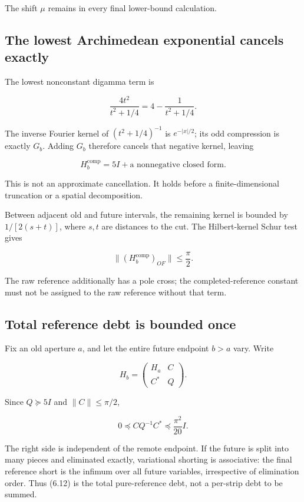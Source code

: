 \documentclass[
  10pt,
  a4paper,
  10pt,
  oneside,
  openany]{book}
\begin{document}
The shift \(\mu\) remains in every final lower-bound calculation.

\subsection{The lowest Archimedean exponential cancels
exactly}\label{the-lowest-archimedean-exponential-cancels-exactly}

The lowest nonconstant digamma term is

\[
\frac{4t^2}{t^2+1/4}=4-\frac1{t^2+1/4}.
\tag{6.8}\label{eq:6.8}
\]

The inverse Fourier kernel of \((t^2+1/4)^{-1}\) is \(e^{-|x|/2}\); its
odd compression is exactly \(G_b\). Adding \(G_b\) therefore cancels
that negative kernel, leaving

\[
H_b^{\mathrm{comp}}=5I+\text{a nonnegative closed form}.
\tag{6.9}\label{eq:6.9}
\]

This is not an approximate cancellation. It holds before a
finite-dimensional truncation or a spatial decomposition.

Between adjacent old and future intervals, the remaining kernel is
bounded by \(1/[2(s+t)]\), where \(s,t\) are distances to the cut. The
Hilbert-kernel Schur test gives

\[
\|(H_b^{\mathrm{comp}})_{OF}\|\le\frac\pi2.
\tag{6.10}\label{eq:6.10}
\]

The raw reference additionally has a pole cross; the completed-reference
constant must not be assigned to the raw reference without that term.

\subsection{Total reference debt is bounded
once}\label{total-reference-debt-is-bounded-once}

Fix an old aperture \(a\), and let the entire future endpoint \(b>a\)
vary. Write

\[
H_b=\begin{pmatrix}H_a&C\\C^*&Q\end{pmatrix}.
\tag{6.11}\label{eq:6.11}
\]

Since \(Q\succeq5I\) and \(\|C\|\le\pi/2\),

\[
0\preceq CQ^{-1}C^*\preceq\frac{\pi^2}{20}I.
\tag{6.12}\label{eq:6.12}
\]

The right side is independent of the remote endpoint. If the future is
split into many pieces and eliminated exactly, variational shorting is
associative: the final reference short is the infimum over all future
variables, irrespective of elimination order. Thus (6.12) is the total
pure-reference debt, not a per-strip debt to be summed.
\end{document}
